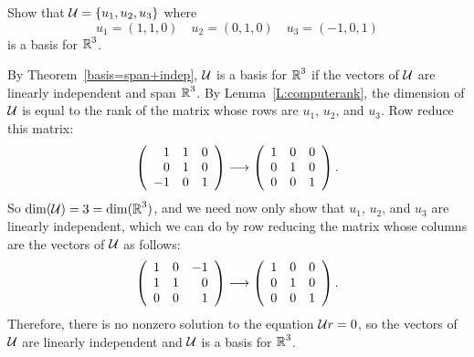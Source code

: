 \documentclass{ximera}
\begin{document}
\begin{exercise} \label{c5.5.1}
Show that ${\cal U}=\{u_1,u_2,u_3\}$ where
\[
u_1=(1,1,0) \quad u_2=(0,1,0) \quad u_3=(-1,0,1)
\]
is a basis for $\mbox{$\Bbb{R}$}^3$.

\begin{solution}

By Theorem~\ref{basis=span+indep},
${\cal U}$ is a basis for $\mbox{$\Bbb{R}$}^3$ if the vectors of ${\cal U}$ are
linearly independent and span $\mbox{$\Bbb{R}$}^3$.  By Lemma~\ref{L:computerank},
the dimension of ${\cal U}$ is equal to the rank of the matrix whose
rows are $u_1$, $u_2$, and $u_3$.  Row reduce this matrix:
\[
\left(\begin{array}{rrr} 1 & 1 & 0 \\ 0 & 1 & 0 \\ -1 & 0 & 1\end{array}\right) \longrightarrow
\left(\begin{array}{rrr} 1 & 0 & 0 \\ 0 & 1 & 0 \\ 0 & 0 & 1\end{array}\right).
\]
So $\dim({\cal U}) = 3 = \dim(\mbox{$\Bbb{R}$}^3)$, and we need now only show that
$u_1$, $u_2$, and $u_3$ are linearly independent, which we can do by
row reducing the matrix whose columns are the vectors of ${\cal U}$ as
follows:
\[
\left(\begin{array}{rrr} 1 & 0 & -1 \\ 1 & 1 & 0 \\ 0 & 0 & 1\end{array}\right) \longrightarrow
\left(\begin{array}{rrr} 1 & 0 & 0 \\ 0 & 1 & 0 \\ 0 & 0 & 1\end{array}\right).
\]
Therefore, there is no nonzero solution to the equation
${\cal U}r = 0$, so the vectors of ${\cal U}$ are linearly independent
and ${\cal U}$ is a basis for $\mbox{$\Bbb{R}$}^3$.

\end{solution}
\end{exercise}
\end{document}
